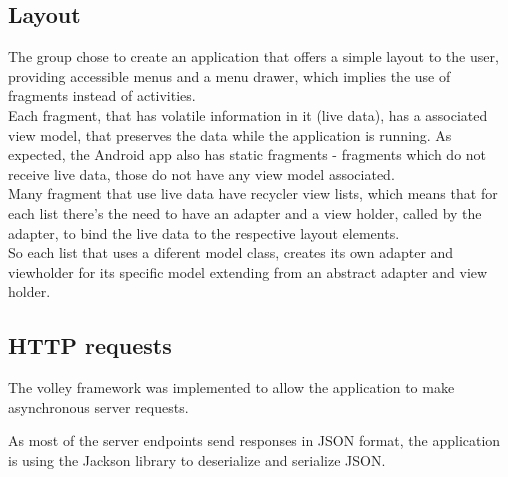 \subsection{Layout}

The group chose to create an application that offers a simple layout to the user, providing accessible menus and a
menu drawer, which implies the use of fragments instead of activities.\\

Each fragment, that has volatile information in it (live data), has a associated view model, that preserves the data while the application is running. 
As expected, the Android app also has static fragments - fragments which do not receive live data, those do not have any view model associated.\\

Many fragment that use live data have recycler view lists, which means that for each list there's the need to have an adapter and a view holder, called by the adapter,
to bind the live data to the respective layout elements.\\

So each list that uses a diferent model class, creates its own adapter and viewholder for its specific model extending from an abstract adapter and view holder.

\subsection{HTTP requests}

The volley framework was implemented to allow the application to make asynchronous server requests.

As most of the server endpoints send responses in JSON format, the application is using the Jackson library to deserialize and serialize JSON.